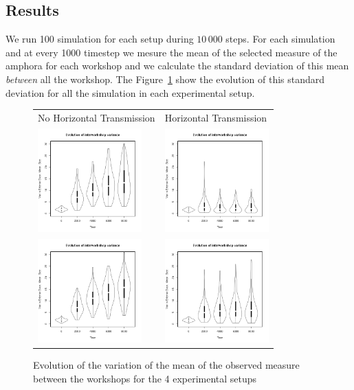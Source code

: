 \documentclass[a4paper]{article}
\begin{document}
\subsection{Results}
We run 100 simulation for each setup during $10\,000$ steps. For each simulation and at every 1000 timestep we mesure the mean of the selected measure of the amphora for each workshop and we calculate the standard deviation of this mean \emph{between} all the workshop. The Figure~\ref{fig:resmod} show the evolution of  this standard deviation for all the simulation in each experimental setup.
    \begin{figure}[h!]
    \centering
	\begin{tabular}{m{4cm}m{4cm}}
	    {\tiny \hspace{.4cm}No Horizontal Transmission} & {\centering\tiny Horizontal Transmission }\\
	    \includegraphics[height=4cm]{images/lineNC.png}
	    &
	    \includegraphics[height=4cm]{images/lineC.png}\\
	    \includegraphics[height=4cm]{images/cubeNC.png}
	    &
	    \includegraphics[height=4cm]{images/cubeC.png}\\
	\end{tabular}
	\caption{Evolution of the variation of the mean of the observed measure between the workshops for the 4 experimental setups}
	\label{fig:resmod}
    \end{figure}
\end{document}
